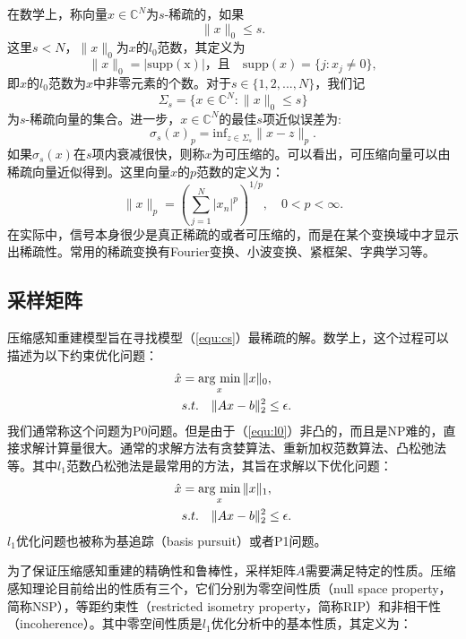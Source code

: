 在数学上，称向量$x\in \mathbb{C}^N$为$s$-稀疏的，如果
\begin{equation}
	\|x\|_0 \leq s.
\end{equation}
这里$s<N$，$\|x\|_0$为$x$的$l_0$范数，其定义为
$$\|x\|_0=|\mathrm{supp(x)}|，且\quad \mathrm{supp}(x)=\{j: x_j\neq 0\},$$
即$x$的$l_0$范数为$x$中非零元素的个数。对于$s\in \{1,2,...,N\}$，我们记
$$\Sigma_s=\{x\in\mathbb{C}^N: \|x\|_0\leq s\}$$
为$s$-稀疏向量的集合。进一步，$x\in \mathbb{C}^N$的最佳$s$项近似误差为:
$$\sigma_s(x)_p=\mathrm{inf}_{z\in \Sigma_s}\|x-z\|_p.$$
如果$\sigma_s(x)$在$s$项内衰减很快，则称$x$为可压缩的。可以看出，可压缩向量可以由稀疏向量近似得到。这里向量$x$的$p$范数的定义为：
\begin{equation}
	\|x\|_p = (\sum_{j=1}^N|x_n|^p)^{1/p},\quad 0<p<\infty.
\end{equation}
在实际中，信号本身很少是真正稀疏的或者可压缩的，而是在某个变换域中才显示出稀疏性。常用的稀疏变换有Fourier变换、小波变换、紧框架、字典学习等。

\subsection{采样矩阵}
压缩感知重建模型旨在寻找模型（\ref{equ:cs}）最稀疏的解。数学上，这个过程可以描述为以下约束优化问题：
\begin{equation}
\begin{aligned}
	\hat{x}&=\argmin_x \|x\|_0,\\
	&s.t.\quad \|Ax-b\|_2^2 \leq \epsilon.
\end{aligned}
\label{equ:l0}
\end{equation}
我们通常称这个问题为P0问题。但是由于（\ref{equ:l0}）非凸的，而且是NP难的，直接求解计算量很大。通常的求解方法有贪婪算法\cite{cosamp,tropp2006just}、重新加权范数算法\cite{gorodnitsky1997sparse,candes2008enhancing}、凸松弛法\cite{chen2001atomic}等。其中$l_1$范数凸松弛法是最常用的方法，其旨在求解以下优化问题：
\begin{equation}
\begin{aligned}
	\hat{x}&=\argmin_x \|x\|_1,\\
	&s.t.\quad \|Ax-b\|_2^2 \leq \epsilon.
\end{aligned}
\label{equ:l1}
\end{equation}
$l_1$优化问题也被称为基追踪（basis pursuit\cite{bp}）或者P1问题。

为了保证压缩感知重建的精确性和鲁棒性，采样矩阵$A$需要满足特定的性质。压缩感知理论目前给出的性质有三个，它们分别为零空间性质（null space property，简称NSP），等距约束性（restricted isometry property，简称RIP）和非相干性（incoherence）。其中零空间性质是$l_1$优化分析中的基本性质，其定义为：

